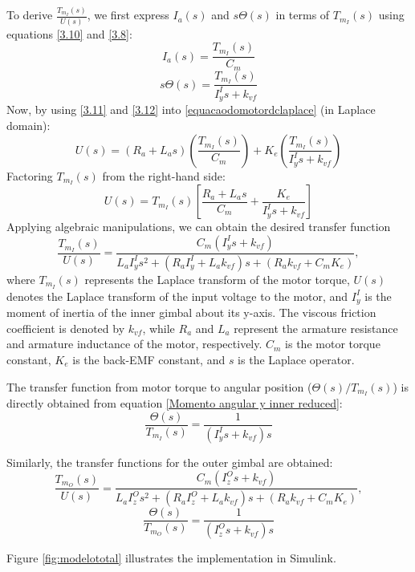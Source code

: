 To derive $\frac{T_{m_I}(s)}{U(s)}$, we first express $I_a(s)$ and $s\Theta(s)$ in terms of $T_{m_I}(s)$ using equations \eqref{3.10} and \eqref{3.8}:
\begin{equation}
	\label{3.11}
I_a(s) = \frac{T_{m_I}(s)}{C_m}
\end{equation}
\begin{equation}
	\label{3.12}
s\Theta(s) = \frac{T_{m_I}(s)}{I_y^I s + k_{vf}}
\end{equation}
Now, by using \eqref{3.11} and \eqref{3.12} into \eqref{equacaodomotordclaplace} (in Laplace domain):
$$U(s) = (R_a + L_a s) \left(\frac{T_{m_I}(s)}{C_m}\right) + K_e \left(\frac{T_{m_I}(s)}{I_y^I s + k_{vf}}\right)$$
Factoring $T_{m_I}(s)$ from the right-hand side:
$$U(s) = T_{m_I}(s) \left[ \frac{R_a + L_a s}{C_m} + \frac{K_e}{I_y^I s + k_{vf}} \right]$$
Applying algebraic manipulations, we can obtain the desired transfer function
\begin{equation}
\frac{T_{m_I}(s)}{U(s)} = \frac{C_m (I_y^I s + k_{vf})}{L_a I_y^I s^2 + (R_a I_y^I + L_a k_{vf})s + (R_a k_{vf} + C_m K_e)},
\end{equation}
where $T_{m_I}(s)$ represents the Laplace transform of the motor torque, $U(s)$ denotes the Laplace transform of the input voltage to the motor, and $I_y^I$ is the moment of inertia of the inner gimbal about its y-axis. The viscous friction coefficient is denoted by $k_{vf}$, while $R_a$ and $L_a$ represent the armature resistance and armature inductance of the motor, respectively. $C_m$ is the motor torque constant, $K_e$ is the back-EMF constant, and $s$ is the Laplace operator.

The transfer function from motor torque to angular position ($\Theta (s)/T_{m_I}(s)$) is directly obtained from equation \eqref{Momento angular y inner reduced}:
\begin{equation}
    \frac{\Theta(s)}{T_{m_I}(s)} = \frac{1}{(I_y^I s + k_{vf}) s}
\end{equation}

Similarly, the transfer functions for the outer gimbal are obtained:
\begin{equation}
\frac{T_{m_O}(s)}{U(s)} = \frac{C_m (I_z^O s + k_{vf})}{L_a I_z^O s^2 + (R_a I_z^O + L_a k_{vf})s + (R_a k_{vf} + C_m K_e)},
\end{equation}
\begin{equation}
    \frac{\Theta(s)}{T_{m_O}(s)} = \frac{1}{(I_z^O s + k_{vf}) s}
\end{equation}

Figure \ref{fig:modelototal} illustrates the implementation in Simulink.

